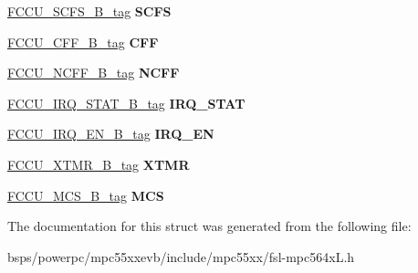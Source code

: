 \begin{DoxyCompactItemize}
\mbox{\label{structFCCU__struct__tag_a00f0cc27e09c535617ccef9d7b9aa11a}} 
\mbox{\hyperlink{unionFCCU__SCFS__32B__tag}{F\+C\+C\+U\+\_\+\+S\+C\+F\+S\+\_\+B\+\_\+tag}} {\bfseries S\+C\+FS}
\item 
\mbox{\label{structFCCU__struct__tag_abc7be1465d4d22219fee12a78de7e492}} 
\mbox{\hyperlink{unionFCCU__CFF__32B__tag}{F\+C\+C\+U\+\_\+\+C\+F\+F\+\_\+B\+\_\+tag}} {\bfseries C\+FF}
\item 
\mbox{\label{structFCCU__struct__tag_a5ed3a18c998200cc7137c551458e2cfd}} 
\mbox{\hyperlink{unionFCCU__NCFF__32B__tag}{F\+C\+C\+U\+\_\+\+N\+C\+F\+F\+\_\+B\+\_\+tag}} {\bfseries N\+C\+FF}
\item 
\mbox{\label{structFCCU__struct__tag_a817bd0d1a58ef4a9fa1ea2eac01edd06}} 
\mbox{\hyperlink{unionFCCU__IRQ__STAT__32B__tag}{F\+C\+C\+U\+\_\+\+I\+R\+Q\+\_\+\+S\+T\+A\+T\+\_\+B\+\_\+tag}} {\bfseries I\+R\+Q\+\_\+\+S\+T\+AT}
\item 
\mbox{\label{structFCCU__struct__tag_ac8d2a884d46694a0c8a0f5c53dd56cc3}} 
\mbox{\hyperlink{unionFCCU__IRQ__EN__32B__tag}{F\+C\+C\+U\+\_\+\+I\+R\+Q\+\_\+\+E\+N\+\_\+B\+\_\+tag}} {\bfseries I\+R\+Q\+\_\+\+EN}
\item 
\mbox{\label{structFCCU__struct__tag_afb00a3db015faef635a170fd0f988e6b}} 
\mbox{\hyperlink{unionFCCU__XTMR__32B__tag}{F\+C\+C\+U\+\_\+\+X\+T\+M\+R\+\_\+B\+\_\+tag}} {\bfseries X\+T\+MR}
\item 
\mbox{\label{structFCCU__struct__tag_a1bf143124b1350b0f31f8ad20aac791d}} 
\mbox{\hyperlink{unionFCCU__MCS__32B__tag}{F\+C\+C\+U\+\_\+\+M\+C\+S\+\_\+B\+\_\+tag}} {\bfseries M\+CS}
\end{DoxyCompactItemize}


The documentation for this struct was generated from the following file\+:\begin{DoxyCompactItemize}
\item 
bsps/powerpc/mpc55xxevb/include/mpc55xx/fsl-\/mpc564x\+L.\+h\end{DoxyCompactItemize}
